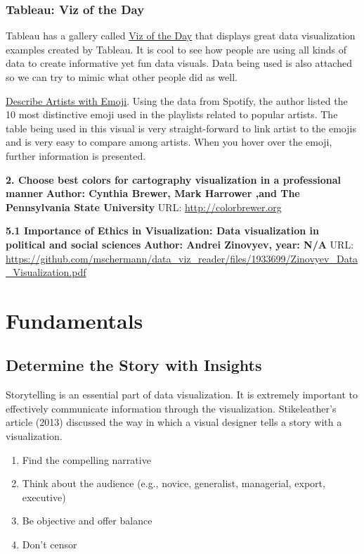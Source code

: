 \documentclass[]{book}
\providecommand{\tightlist}{%
  \setlength{\itemsep}{0pt}\setlength{\parskip}{0pt}}
\theoremstyle{definition}
\theoremstyle{definition}
\theoremstyle{definition}
\theoremstyle{remark}
\begin{document}
\subsection{Tableau: Viz of the Day}\label{tableau-viz-of-the-day}

Tableau has a gallery called
\href{https://public.tableau.com/en-us/s/gallery}{Viz of the Day} that
displays great data visualization examples created by Tableau. It is
cool to see how people are using all kinds of data to create informative
yet fun data visuals. Data being used is also attached so we can try to
mimic what other people did as well.

\href{https://public.tableau.com/en-us/s/gallery/what-emoji-say-about-music?gallery=featured}{Describe
Artists with Emoji}. Using the data from Spotify, the author listed the
10 most distinctive emoji used in the playlists related to popular
artists. The table being used in this visual is very straight-forward to
link artist to the emojis and is very easy to compare among artists.
When you hover over the emoji, further information is presented.

\textbf{2. Choose best colors for cartography visualization in a
professional manner} \textbf{Author: Cynthia Brewer, Mark Harrower ,and
The Pennsylvania State University} URL: \url{http://colorbrewer.org}

\textbf{5.1 Importance of Ethics in Visualization: Data visualization in
political and social sciences} \textbf{Author: Andrei Zinovyev, year:
N/A} URL:
\url{https://github.com/mschermann/data_viz_reader/files/1933699/Zinovyev_Data_Visualization.pdf}

\chapter{Fundamentals}\label{fundamentals}

\section{Determine the Story with
Insights}\label{determine-the-story-with-insights}

Storytelling is an essential part of data visualization. It is extremely
important to effectively communicate information through the
visualization. Stikeleather's article (2013) discussed the way in which
a visual designer tells a story with a visualization.

\begin{enumerate}
\def\labelenumi{\arabic{enumi}.}
\tightlist
\item
  Find the compelling narrative
\item
  Think about the audience (e.g., novice, generalist, managerial,
  export, executive)
\item
  Be objective and offer balance
\item
  Don't censor
\end{enumerate}
\end{document}
